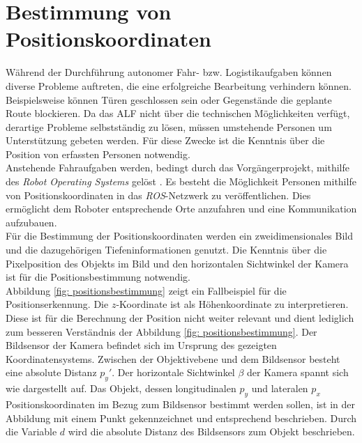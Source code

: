 	
		
	
	\section{Bestimmung von Positionskoordinaten}
	\label{sec: Bestimmung der Positionskoordinaten}
		Während der Durchführung autonomer Fahr- bzw. Logistikaufgaben können diverse Probleme auftreten, die eine erfolgreiche Bearbeitung verhindern können. Beispielsweise können Türen geschlossen sein oder Gegenstände die geplante Route blockieren. Da das ALF nicht über die technischen Möglichkeiten verfügt, derartige Probleme selbstständig zu lösen, müssen umstehende Personen um Unterstützung gebeten werden. Für diese Zwecke ist die Kenntnis über die Position von erfassten Personen notwendig.\\
		
	
		Anstehende Fahraufgaben werden, bedingt durch das Vorgängerprojekt, mithilfe des \textit{Robot Operating Systems} gelöst \cite{Bachelorarbeit}. Es besteht die Möglichkeit Personen mithilfe von Positionskoordinaten in das \textit{ROS}-Netzwerk zu veröffentlichen. Dies ermöglicht dem Roboter entsprechende Orte anzufahren und eine Kommunikation aufzubauen.\\
		
		Für die Bestimmung der Positionskoordinaten werden ein zweidimensionales Bild und die dazugehörigen Tiefeninformationen genutzt. Die Kenntnis über die Pixelposition des Objekts im Bild und den horizontalen Sichtwinkel der Kamera ist für die Positionsbestimmung notwendig.\\
		
		Abbildung \ref{fig: positionsbestimmung} zeigt ein Fallbeispiel für die Positionserkennung. Die $z$-Koordinate ist als Höhenkoordinate zu interpretieren. Diese ist für die Berechnung der Position nicht weiter relevant und dient lediglich zum besseren Verständnis der Abbildung \ref{fig: positionsbestimmung}. Der Bildsensor der Kamera befindet sich im Ursprung des gezeigten Koordinatensystems. Zwischen der Objektivebene und dem Bildsensor besteht eine absolute Distanz ${p_y}'$. Der horizontale Sichtwinkel $\beta$ der Kamera spannt sich wie dargestellt auf. Das Objekt, dessen longitudinalen $p_y$ und lateralen $p_x$ Positionskoordinaten im Bezug zum Bildsensor bestimmt werden sollen, ist in der Abbildung mit einem Punkt gekennzeichnet und entsprechend beschrieben. Durch die Variable $d$ wird die absolute Distanz des Bildsensors zum Objekt beschrieben.\\
		

